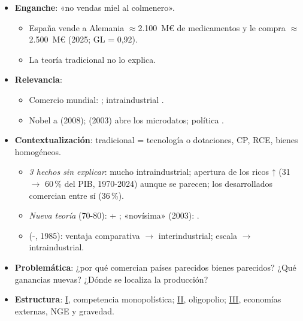 \documentclass{article}
\begin{document}
\cabecerarepaso
\begin{columnas}

\begin{itemize}
\item \textbf{Enganche}: «no vendas miel al colmenero».
  \begin{itemize}
  \item España vende a Alemania $\approx$2.100~M€ de medicamentos y le compra $\approx$2.500~M€ (2025; GL = 0,92).
  \item La teoría tradicional  no lo explica.
  \end{itemize}
\item \textbf{Relevancia}:
  \begin{itemize}
  \item Comercio mundial: ; intraindustrial .
  \item Nobel a  (2008);  (2003) abre los microdatos; política .
  \end{itemize}
\item \textbf{Contextualización}: tradicional = tecnología o dotaciones, CP, RCE, bienes homogéneos.
  \begin{itemize}
  \item \emph{3 hechos sin explicar}: mucho intraindustrial; apertura de los ricos ↑ (31 $\to$ 60\,\% del PIB, 1970-2024) aunque se parecen; los desarrollados comercian entre sí (36\,\%).
  \item \emph{Nueva teoría} (70-80):  +   ; «novísima» (2003): .
  \item {} (-, 1985): ventaja comparativa $\to$ interindustrial; escala $\to$ intraindustrial.
  \end{itemize}
\item \textbf{Problemática}: ¿por qué comercian países parecidos bienes parecidos? ¿Qué ganancias nuevas? ¿Dónde se localiza la producción?
\item \textbf{Estructura}: \hyperref[rep:I]{I}, competencia monopolística; \hyperref[rep:II]{II}, oligopolio; \hyperref[rep:III]{III}, economías externas, NGE y gravedad.
\end{itemize}


\end{columnas}
\end{document}
